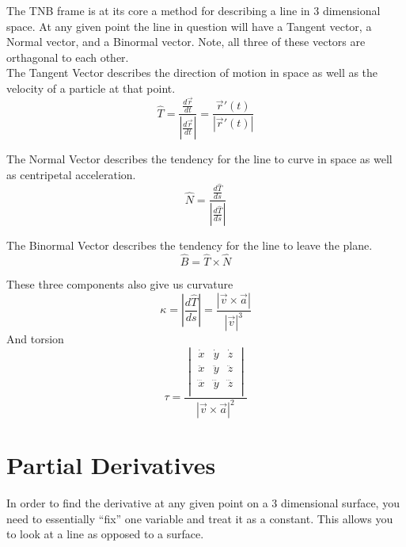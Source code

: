 \documentclass{article}
\newcommand{\abs}[1]{\left\lvert #1 \right\rvert}
\begin{document}
The TNB frame is at its core a method for describing a line in 3 dimensional space. At any given point the line in question will have a Tangent vector, a Normal vector, and a Binormal vector. Note, all three of these vectors are orthagonal to each other.\\

The Tangent Vector describes the direction of motion in space as well as the velocity of a particle at that point.
\begin{equation}
\hat{T} = \frac{\frac{d\vec{r}}{dt}}{\abs{\frac{d\vec{r}}{dt}}} =
\frac{\vec{r}\prime(t)}{\abs{\vec{r}\prime(t)}}
\end{equation}

The Normal Vector describes the tendency for the line to curve in space as well as centripetal acceleration.
\begin{equation}
\hat{N} = \frac{\frac{d\hat{T}}{ds}}{\abs{\frac{d\hat{T}}{ds}}}
\end{equation}

The Binormal Vector describes the tendency for the line to leave the plane.
\begin{equation}
\hat{B} = \hat{T} \times \hat{N}
\end{equation}

These three components also give us curvature
\begin{equation}
\kappa = \abs{\frac{d\hat{T}}{ds}} = \frac{\abs{\vec{v}\times\vec{a}}}{\abs{\vec{v}}^3}
\end{equation}
\indent And torsion
\begin{equation}
\tau = \frac{
    \begin{vmatrix}
    \dot{x} & \dot{y} & \dot{z}\\
    \ddot{x} & \ddot{y} & \ddot{z}\\
    \dddot{x} & \dddot{y} & \dddot{z}\\
    \end{vmatrix}
}{\abs{\vec{v}\times\vec{a}}^2}
\end{equation}

\section{Partial Derivatives}
In order to find the derivative at any given point on a 3 dimensional surface, you need to essentially ``fix'' one variable and treat it as a constant. This allows you to look at a line as opposed to a surface.
\end{document}
